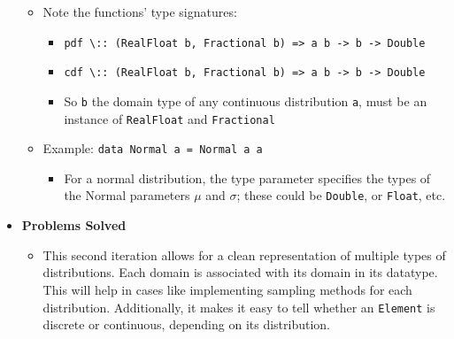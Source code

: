 \documentclass[11pt]{article}
\begin{document}
\begin{itemize}
\begin{itemize}
\item Note the functions' type signatures:
\begin{itemize}
\item \texttt{pdf \textbackslash{}:: (RealFloat b, Fractional b) => a b -> b -> Double}
\item \texttt{cdf \textbackslash{}:: (RealFloat b, Fractional b) => a b -> b -> Double}
\item So \texttt{b} the domain type of any continuous distribution \texttt{a}, must
be an instance of \texttt{RealFloat} and \texttt{Fractional}
\end{itemize}
\item Example: \texttt{data Normal a = Normal a a}
\begin{itemize}
\item For a normal distribution, the type parameter specifies the types
of the Normal parameters $\mu$ and $\sigma$; these could be \texttt{Double}, 
or \texttt{Float}, etc.
\end{itemize}
\end{itemize}
\item \textbf{Problems Solved}
\begin{itemize}
\item This second iteration allows for a clean representation of
multiple types of distributions. Each domain is associated with
its domain in its datatype. This will help in cases like
implementing sampling methods for each distribution. Additionally,
it makes it easy to tell whether an \texttt{Element} is discrete or continuous,
depending on its distribution.
\end{itemize}
\end{itemize}
\end{document}
